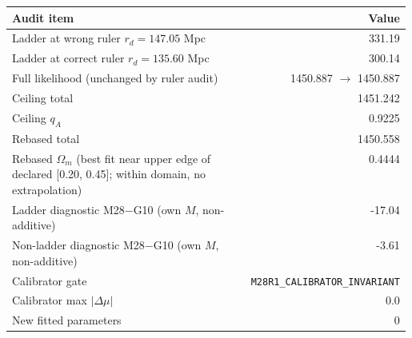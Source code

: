 {\footnotesize\setlength{\tabcolsep}{3pt}
\begin{tabular}{p{0.58\linewidth}r}
\toprule
Audit item & Value \\
\midrule
Ladder at wrong ruler $r_{d}=147.05$ Mpc & 331.19 \\
Ladder at correct ruler $r_{d}=135.60$ Mpc & 300.14 \\
Full likelihood (unchanged by ruler audit) & 1450.887 $\rightarrow$ 1450.887 \\
Ceiling total & 1451.242 \\
Ceiling $q_A$ & 0.9225 \\
Rebased total & 1450.558 \\
Rebased $\Omega_m$ (best fit near upper edge of declared [0.20, 0.45]; within domain, no extrapolation) & 0.4444 \\
Ladder diagnostic M28$-$G10 (own $M$, non-additive) & -17.04 \\
Non-ladder diagnostic M28$-$G10 (own $M$, non-additive) & -3.61 \\
Calibrator gate & \texttt{M28R1\_CALIBRATOR\_INVARIANT} \\
Calibrator max $|\Delta\mu|$ & 0.0 \\
New fitted parameters & 0 \\
\bottomrule
\end{tabular}}
